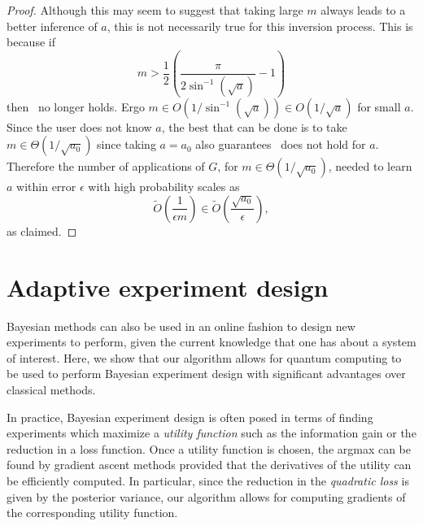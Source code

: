 \documentclass[aps,amsmath,onecolumn,amssymb]{revtex4}
\begin{document}
\begin{proof}
Although this may seem to suggest that taking large $m$ always leads to a better inference of $a$, this is not necessarily true for this inversion process.  This is because if 
\begin{equation}
m > \frac{1}{2}\left(\frac{\pi}{2\sin^{-1}(\sqrt{a})}-1\right)\label{eq:mvalid}
\end{equation} then~ no longer holds.  Ergo $m\in O(1/\sin^{-1}(\sqrt{a}))\in O(1/\sqrt{a})$ for small $a$.  Since the user does not know $a$, the best that can be done is to take $m\in \Theta(1/\sqrt{a_0})$ since taking $a=a_0$ also guarantees~ does not hold for $a$.  Therefore the number of applications of $G$, for $m\in \Theta(1/\sqrt{a_0})$, needed to learn $a$ within error $\epsilon$ with high probability scales as
\begin{equation}
\tilde O\left(\frac{1}{\epsilon m} \right) \in \tilde O\left(\frac{\sqrt{a_0}}{\epsilon} \right),
\end{equation}
as claimed.
\end{proof}




\section{Adaptive experiment design}

Bayesian methods can also be used in an online fashion to design new
experiments to perform, given the current knowledge that one has about a
system of interest. Here, we show that our algorithm allows for quantum
computing to be used to perform Bayesian experiment design with significant
advantages over classical methods.

In practice, Bayesian experiment design is often posed in terms of finding
experiments which maximize a \emph{utility function} such as the information
gain or the reduction in a loss function. Once a utility function is
chosen, the argmax can be found by gradient ascent methods provided that the
derivatives of the utility can be efficiently computed. In particular, since
the reduction in the \emph{quadratic loss} is given by the posterior variance,
our algorithm allows for computing gradients of the corresponding utility
function.

\end{document}
